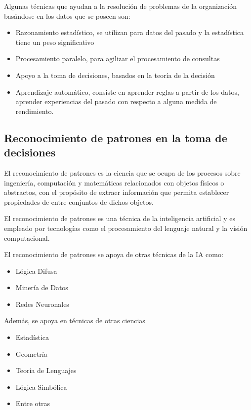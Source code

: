 Algunas técnicas que ayudan a la resolución de problemas de la organización basándose en los datos que se poseen son:
\begin{itemize}
\item Razonamiento estadístico, se utilizan para datos del pasado y la estadística tiene un peso significativo 

\item Procesamiento paralelo, para agilizar el procesamiento de consultas 

\item Apoyo a la toma de decisiones, basados en la teoría de la decisión 

\item Aprendizaje automático, consiste en aprender reglas a partir de los datos, aprender experiencias del pasado con respecto a alguna medida de rendimiento.\cite{R. Lopez.}
\end{itemize}


\subsection{Reconocimiento de patrones en la toma de decisiones } 

El reconocimiento de patrones es la ciencia que se ocupa de los procesos sobre ingeniería, computación y matemáticas relacionados con objetos físicos o abstractos, con el propósito de extraer información que permita establecer propiedades de entre conjuntos de dichos objetos. \cite{TomaDecisiones}

El reconocimiento de patrones es una técnica de la inteligencia artificial y es empleado por tecnologías como el procesamiento del lenguaje natural y la visión computacional.\cite{TecnicasDecisiones} 

El reconocimiento de patrones se apoya de otras técnicas de la IA como: 
\begin{itemize}
\item Lógica Difusa 

\item Minería de Datos 

\item Redes Neuronales 
\end{itemize} 

Además, se apoya en técnicas de otras ciencias
\begin{itemize}
\item Estadística 

\item Geometría 

\item Teoría de Lenguajes 

\item Lógica Simbólica 

\item Entre otras 
\end{itemize}


